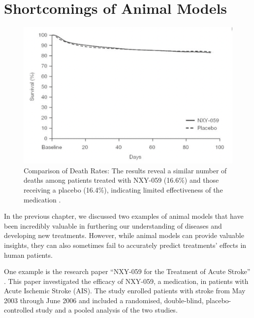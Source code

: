 \documentclass[10pt]{article}
\begin{document}
\begin{sloppypar}
  \section{Shortcomings of Animal Models}
  \label{sec:shortcomings}

  \vspace{10pt} %
  \begin{figure}[ht]
    \centering
    \includegraphics[width=\textwidth]{figures/death-rates.png}
    \caption[Comparison of Death Rates: The results reveal a similar number of deaths among patients treated with NXY-059 (16.6\%) and those receiving a placebo (16.4\%), indicating limited effectiveness of the medication]{Comparison of Death Rates: The results reveal a similar number of deaths among patients treated with NXY-059 (16.6\%) and those receiving a placebo (16.4\%), indicating limited effectiveness of the medication \citep{diener_nxy-059_2008}.}
    \label{fig:death-rates}
  \end{figure}

  In the previous chapter, we discussed two examples of animal models that have been incredibly valuable in furthering our understanding of diseases and developing new treatments. However, while animal models can provide valuable insights, they can also sometimes fail to accurately predict treatments’ effects in human patients.

  One example is the research paper “NXY-059 for the Treatment of Acute Stroke” \citep{diener_nxy-059_2008}. This paper investigated the efficacy of NXY-059, a medication, in patients with Acute Ischemic Stroke (AIS). The study enrolled patients with stroke from May 2003 through June 2006 and included a randomised, double-blind, placebo-controlled study and a pooled analysis of the two studies.


\end{sloppypar}
\end{document}

